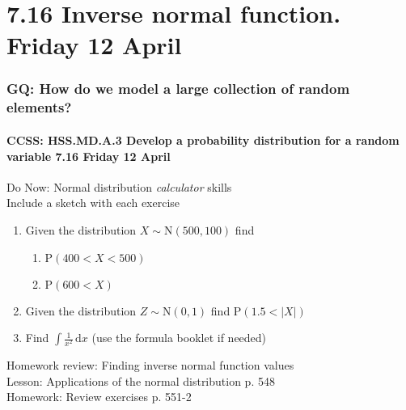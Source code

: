 \documentclass{beamer}
\begin{document}
\section{7.16 Inverse normal function. Friday 12 April}
  \frame
  {
    \frametitle{GQ: How do we model a large collection of random elements?}
    \framesubtitle{CCSS: HSS.MD.A.3 Develop a probability distribution for a random variable \hfill \alert{7.16 Friday 12 April}}

    \begin{block}{Do Now: Normal distribution \emph{calculator} skills\\Include a sketch with each exercise}
    \begin{enumerate}
      \item Given the distribution $X \sim \mathrm{N}(500,100)$ find
      \begin{enumerate}
        \item $\mathrm{P}(400<X<500)$
        \item $\mathrm{P}(600<X)$
      \end{enumerate}
      \item Given the distribution $Z \sim \mathrm{N}(0,1)$ find $\mathrm{P}(1.5<|X|)$
      \item Find $\displaystyle \int \frac{1}{x^2} \,\mathrm{d}x$ (use the formula booklet if needed)
    \end{enumerate}
    \end{block}
    Homework review: Finding inverse normal function values\\
    Lesson: Applications of the normal distribution p. 548\\
    Homework: Review exercises p. 551-2
  }
\end{document}
